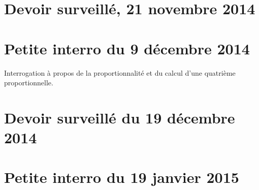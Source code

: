 
\section{Devoir surveillé, 21 novembre 2014}


\section{Petite interro du 9 décembre 2014}

Interrogation à propos de la proportionnalité et du calcul d'une quatrième proportionnelle.


\section{Devoir surveillé du 19 décembre 2014}


\section{Petite interro du 19 janvier 2015}

